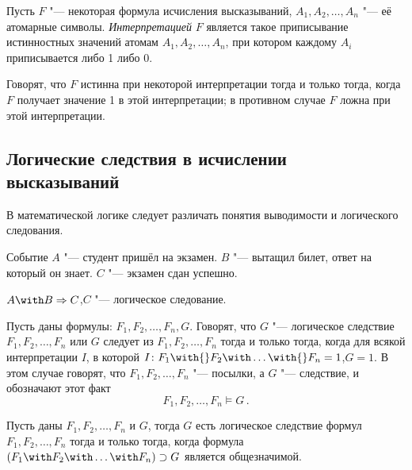 \begin{defin}[интерпретации] Пусть $F$ "--- некоторая формула
исчисления высказываний, $A_1,A_2,\ldots,A_n$ "--- её атомарные
символы. \emph{Интерпретацией} $F$ является такое приписывание
истинностных значений атомам $A_1,A_2,\ldots,A_n$, при котором каждому
$A_i$ приписывается либо 1 либо 0.
\end{defin}

Говорят, что $F$ истинна при некоторой интерпретации тогда и только
тогда, когда $F$ получает значение 1 в этой интерпретации; в противном
случае $F$ ложна при этой интерпретации.

\subsection{Логические следствия в исчислении высказываний}

В математической логике следует различать понятия выводимости и
логического следования.

\begin{ex} Событие $A$ "--- студент пришёл на
экзамен. $B$ "--- вытащил билет, ответ на который он знает. $C$ "---
экзамен сдан успешно.
  \begin{center} $A \with B \Rightarrow C$,\qquad $C$ "--- логическое
следование.
  \end{center}
\end{ex}

\begin{defin} Пусть даны формулы: $F_1,F_2,\ldots,F_n,G$. Говорят, что
$G$ "--- логическое следствие $F_1,F_2,\ldots,F_n$ или $G$ следует из
$F_1,F_2,\ldots,F_n$ тогда и только тогда, когда для всякой
интерпретации $I$, в которой $I\colon
F_1\with{}F_2\with\ldots\with{}F_n = 1$,\quad$G = 1$. В этом случае
говорят, что $F_1,F_2,\ldots,F_n$ "--- посылки, а $G$ "--- следствие, и
обозначают этот факт
  \begin{equation} F_1,F_2,\ldots,F_n \models G\,.
  \end{equation}
\end{defin}

\begin{theorem} Пусть даны $F_1,F_2,\ldots,F_n$ и $G$, тогда $G$ есть
логическое следствие формул $F_1,F_2,\ldots,F_n$ тогда и только тогда,
когда формула $(F_1 \with F_2 \with\ldots\with F_n) \supset G$
является общезначимой.
\end{theorem}

